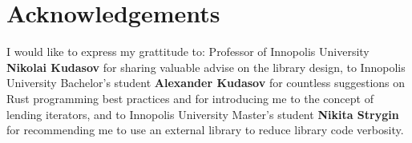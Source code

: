 \chapter{Acknowledgements}
\label{chap:ack}

I would like to express my grattitude to:
Professor of Innopolis University \textbf{Nikolai Kudasov} for sharing valuable advise on the
library design, to Innopolis University Bachelor's student \textbf{Alexander Kudasov} for
countless suggestions on Rust programming best practices and for introducing me to the concept of
lending iterators, and to Innopolis University Master's student \textbf{Nikita Strygin}
for recommending me to use an external library to reduce library code verbosity.
